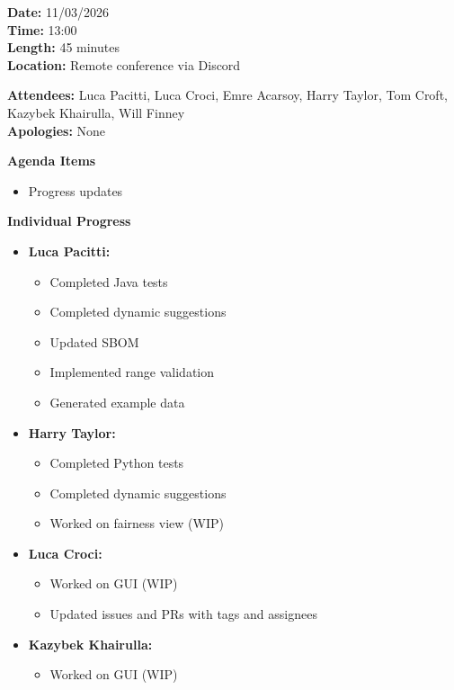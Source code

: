 \documentclass[11pt]{article}
\begin{document}
    \textbf{Date:} 11/03/2026 \\
    \textbf{Time:} 13:00 \\
    \textbf{Length:} 45 minutes \\
    \textbf{Location:} Remote conference via Discord

    \textbf{Attendees:} Luca Pacitti, Luca Croci, Emre Acarsoy, Harry Taylor, Tom Croft, Kazybek Khairulla, Will Finney \\
    \textbf{Apologies:} None

    \textbf{Agenda Items}
    \begin{itemize}
        \item Progress updates
    \end{itemize}

    \textbf{Individual Progress}
    \begin{itemize}
        \item \textbf{Luca Pacitti:}
        \begin{itemize}
            \item Completed Java tests
            \item Completed dynamic suggestions
            \item Updated SBOM
            \item Implemented range validation
            \item Generated example data
        \end{itemize}

        \item \textbf{Harry Taylor:}
        \begin{itemize}
            \item Completed Python tests
            \item Completed dynamic suggestions
            \item Worked on fairness view (WIP)
        \end{itemize}

        \item \textbf{Luca Croci:}
        \begin{itemize}
            \item Worked on GUI (WIP)
            \item Updated issues and PRs with tags and assignees
        \end{itemize}

        \item \textbf{Kazybek Khairulla:}
        \begin{itemize}
            \item Worked on GUI (WIP)
        \end{itemize}


\end{itemize}
\end{document}
